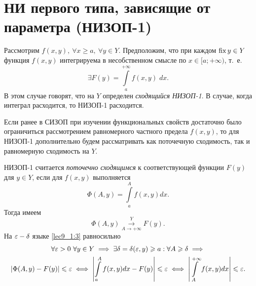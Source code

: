 \documentclass[../../main.tex]{subfiles}
\begin{document}
\section{НИ первого типа, зависящие от параметра (\mbox{НИЗОП-1})}

Рассмотрим $ f(x, y),\ \forall x \geq a,\ \forall y \in Y $.
Предположим, что при каждом $ \operatorname{fix} y \in Y $ функция $ f(x, y) $
интегрируема в несобственном смысле по $ x \in [a; +\infty) $, т.~е.
\begin{equation}
\label{lec9_1:1}
\exists F(y) = \int\limits_a^{+\infty} f(x, y)\; dx.
\end{equation}
В этом случае говорят, что на $ Y $ определен \emph{сходящийся НИЗОП-1}.
В случае, когда интеграл расходится, то НИЗОП-1 расходится.

Если ранее в СИЗОП при изучении функциональных свойств достаточно
было ограничиться рассмотрением равномерного частного предела $ f(x, y) $,
то для НИЗОП-1 дополнительно будем рассматривать как поточечную сходимость,
так и равномерную сходимость на $ Y $.

НИЗОП-1 считается \emph{поточечно сходящимся} к соответствующей функции $ F(y) 
$
для ${y \in Y}$, если для $ f(x, y) $ выполняется
\begin{equation}
\label{lec9_1:2}
\Phi(A, y) = \int\limits_a^A f(x, y) dx.
\end{equation}
Тогда имеем
\begin{equation}
\label{lec9_1:3}
\Phi(A, y) \stackrel{Y}{\underset{A \to +\infty}{\to}} F(y).
\end{equation}
На $ \varepsilon-\delta $ языке \eqref{lec9_1:3} равносильно
\begin{equation}
\label{lec9_1:4}
\begin{gathered}
\forall \varepsilon > 0\ \forall y \in Y \implies \exists \delta = \delta(\varepsilon, y)
\geqslant a:\forall A \geqslant \delta \implies\\ 
|\Phi(A, y) - F(y)| \leqslant \varepsilon \iff
\left|\int\limits_a^A f(x, y) dx - F(y)\right| \leqslant \varepsilon \iff
\left|\int\limits_A^{+\infty} f(x, y) dx\right| \leqslant \varepsilon.
\end{gathered}
\end{equation}
\end{document}
